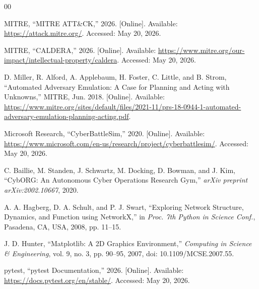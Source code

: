 \documentclass[conference]{IEEEtran}
\begin{document}
\begin{thebibliography}{00}

MITRE, ``MITRE ATT\&CK,'' 2026. [Online]. Available: \url{https://attack.mitre.org/}. Accessed: May 20, 2026.

MITRE, ``CALDERA,'' 2026. [Online]. Available: \url{https://www.mitre.org/our-impact/intellectual-property/caldera}. Accessed: May 20, 2026.

D. Miller, R. Alford, A. Applebaum, H. Foster, C. Little, and B. Strom, ``Automated Adversary Emulation: A Case for Planning and Acting with Unknowns,'' MITRE, Jun. 2018. [Online]. Available: \url{https://www.mitre.org/sites/default/files/2021-11/prs-18-0944-1-automated-adversary-emulation-planning-acting.pdf}.

Microsoft Research, ``CyberBattleSim,'' 2020. [Online]. Available: \url{https://www.microsoft.com/en-us/research/project/cyberbattlesim/}. Accessed: May 20, 2026.

C. Baillie, M. Standen, J. Schwartz, M. Docking, D. Bowman, and J. Kim, ``CybORG: An Autonomous Cyber Operations Research Gym,'' \textit{arXiv preprint arXiv:2002.10667}, 2020.

A. A. Hagberg, D. A. Schult, and P. J. Swart, ``Exploring Network Structure, Dynamics, and Function using NetworkX,'' in \textit{Proc. 7th Python in Science Conf.}, Pasadena, CA, USA, 2008, pp. 11--15.

J. D. Hunter, ``Matplotlib: A 2D Graphics Environment,'' \textit{Computing in Science \& Engineering}, vol. 9, no. 3, pp. 90--95, 2007, doi: 10.1109/MCSE.2007.55.

pytest, ``pytest Documentation,'' 2026. [Online]. Available: \url{https://docs.pytest.org/en/stable/}. Accessed: May 20, 2026.


\end{thebibliography}
\end{document}
